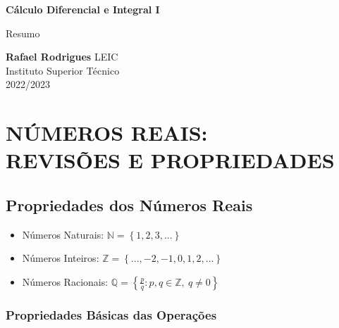 \documentclass[11pt]{article}
\begin{document}
\begin{titlepage}
    \begin{center}
        \vspace*{1cm}

        \textbf{\LARGE Cálculo Diferencial e Integral I}
        \vspace{0.5cm}

        \Large Resumo
        \vspace{1.5cm}

        \textbf{Rafael Rodrigues}
        \vfill
        LEIC \\
        Instituto Superior Técnico \\
        2022/2023
    \end{center}
\end{titlepage}

\tableofcontents

\newpage

\section{\MakeUppercase{Números Reais: \\ Revisões e Propriedades}}

\subsection{Propriedades dos Números Reais}

\begin{itemize}[topsep=0pt]
    \item Números Naturais: $\mathbb{N} = \left\{1, 2, 3, ...\right\}$
    \item Números Inteiros: $\mathbb{Z} = \left\{..., -2, -1, 0, 1, 2, ...\right\}$
    \item Números Racionais: $\mathbb{Q} = \displaystyle \left\{\frac{p}{q}:p,q\in \mathbb{Z},\ q \neq 0\right\}$
\end{itemize}

\subsubsection{Propriedades Básicas das Operações}
\end{document}
